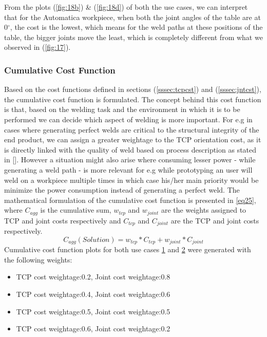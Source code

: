 From the plots (\ref{fig:18b}) \& (\ref{fig:18d}) of both the use cases, we can interpret that for the Automatica workpiece, when both the joint angles of the table are at 0$^{\circ}$, the cost is the lowest, which means for the weld paths at these positions of the table, the bigger joints move the least, which is completely different from what we observed in (\ref{fig:17}). 

\subsubsection{Cumulative Cost Function}
\label{sssec:aggcst}
Based on the cost functions defined in sections (\ref{sssec:tcpcst}) and (\ref{sssec:jntcst}), the cumulative cost function is formulated. The concept behind this cost function is that, based on the welding task and the environment in which it is to be performed we can decide which aspect of welding is more important. For e.g in cases where generating perfect welds are critical to the structural integrity of the end product, we can assign a greater weightage to the TCP orientation cost, as it is directly linked with the quality of weld based on process description as stated in [\citet{DiazP2016}]. However a situation might also arise where consuming lesser power - while generating a weld path - is more relevant for e.g while prototyping an user will weld on a workpiece multiple times in which case his/her main priority would be minimize the power consumption instead of generating a perfect weld. The mathematical formulation of the cumulative cost function is presented in \ref{eq25}, where $C_{agg}$ is the cumulative sum, $w_{tcp}$ and $w_{joint}$ are the weights assigned to TCP and joint costs respectively and $C_{tcp}$ and $C_{joint}$ are the TCP and joint costs respectively. 
\begin{equation}
\label{eq25}
C_{agg}(\textit{Solution}) = w_{tcp}* C_{tcp} +  w_{joint}*C_{joint}
\end{equation}
Cumulative cost function plots for both use cases \hyperref[fig:uc1]{1} and \hyperref[fig:uc2]{2} were generated with the following weights: 
\begin{itemize}
\item TCP cost weightage:0.2, Joint cost weightage:0.8 
\item TCP cost weightage:0.4, Joint cost weightage:0.6
\item TCP cost weightage:0.5, Joint cost weightage:0.5
\item TCP cost weightage:0.6, Joint cost weightage:0.2
\end{itemize}

